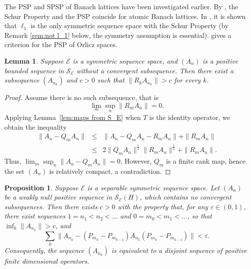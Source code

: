 \documentclass[12pt]{amsart}
\theoremstyle{plain}
\newtheorem{lemma}[theorem]{Lemma}
\newtheorem{proposition}[theorem]{Proposition}
\theoremstyle{definition}
\newcommand{\vr}{\varepsilon}
\newcommand{\ce}{\mathcal E}
\newcommand{\se}{{\mathcal S}_{\mathcal{E}}}
\def \vr{\varepsilon}
\begin{document}
The PSP and SPSP of Banach lattices have been investigated earlier.
By \cite{Wn89a}, the Schur Property and the PSP coincide for atomic Banach lattices.
In \cite{KM00}, it is shown that $\ell_1$ is the only symmetric sequence space
with the Schur Property (by Remark \ref{rem:not l_1} below, the symmetry assumption
is essential). \cite{KM02} gives a criterion for the PSP of Orlicz spaces.

\begin{lemma} \label{lem:pos_seq}
Suppose $\ce$ is a symmetric sequence space, and
$(A_n)$ is a positive bounded sequence in $\se$ without a convergent
subsequence. Then there exist a subsequence $(A_{n_k})$ and $c>0$ such that
$\|R_kA_{n_k}\|>c$ for every $k$.
\end{lemma}

\begin{proof} Assume there is no such subsequence, that is
$$\lim_m {\sup_n{\|R_mA_n\|}}=0.$$
Applying Lemma~\ref{lem:maps from S_E} when $T$ is the identity operator, 
we obtain the inequality
\begin{eqnarray*}
\|A_n-Q_mA_n\|      &\le & \|A_n- Q_mA_n-R_mA_n\|+\|R_mA_n\|\\
          & \le & 2 \|Q_mA_n\|^{\frac{1}{2}}
                \|R_mA_n\|^{\frac{1}{2}}+ \|R_mA_n\| .
\end{eqnarray*}
Thus, $\lim_m \sup_n \|A_n-Q_mA_n\| = 0$. However, $Q_m$ is a finite rank map, hence
the set $(A_n)$ is relatively compact, a contradiction.
\end{proof}

\begin{proposition} \label{prop:glid_hump}
Suppose $\ce$ is a separable symmetric sequence space.
Let $(A_n)$ be a weakly null positive sequence in $\se(H)$,
which contains no convergent subsequences. Then there exists $c > 0$
with the property that, for any $\vr \in (0,1)$, there exist sequences
$1 = n_1 < n_2 < \ldots$ and $0 = m_0 < m_1 < \ldots$, so that
$\inf_k \|A_{n_k}\| > c$, and
$$
\sum_k \|A_{n_k} - (P_{m_k} - P_{m_{k-1}}) A_{n_k} (P_{m_k} - P_{m_{k-1}})\| < \vr .
$$
Consequently, the sequence $(A_{n_k})$ is equivalent to a disjoint sequence of
positive finite dimensional operators.
\end{proposition}
\end{document}
